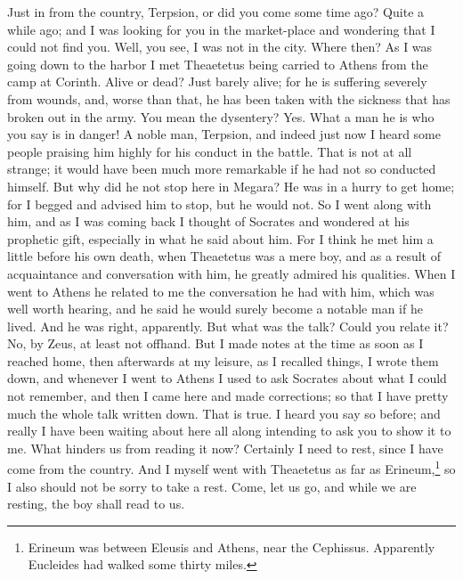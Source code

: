 \documentclass[letterpaper,12pt]{article}
\newcommand{\stephpag}[1]{\marginnote{\small\itshape\fontfamily{ppl}\selectfont #1}}
\begin{document}
\begin{drama}
\setlength{\parindent}{2em}

\eucleidesspeaks
\stephpag{142 a}Just in from the country, Terpsion, or did you come some time ago?
\terpsionspeaks
Quite a while ago; and I was looking for you in the market-place and wondering that I could not find you.
\eucleidesspeaks
Well, you see, I was not in the city.
\terpsionspeaks
Where then?
\eucleidesspeaks
As I was going down to the harbor I met Theaetetus being carried to Athens from the camp at Corinth.
\terpsionspeaks
Alive or dead? \stephpag{b}
\eucleidesspeaks
Just barely alive; for he is suffering severely from wounds, and, worse than that, he has been taken with the sickness that has broken out in the army.
\terpsionspeaks
You mean the dysentery?
\eucleidesspeaks
Yes.
\terpsionspeaks
What a man he is who you say is in danger!
\eucleidesspeaks
A noble man, Terpsion, and indeed just now I heard some people praising him highly for his conduct in the battle.
\terpsionspeaks
That is not at all strange; it would have been much more remarkable if he had not so conducted himself. But why did he not \stephpag{c} stop here in Megara?
\eucleidesspeaks
He was in a hurry to get home; for I begged and advised him to stop, but he would not. So I went along with him, and as I was coming back I thought of Socrates and wondered at his prophetic gift, especially in what he said about him. For I think he met him a little before his own death, when Theaetetus was a mere boy, and as a result of acquaintance and conversation with him, he greatly admired his qualities. When I went to Athens he related to me the conversation \stephpag{d} he had with him, which was well worth hearing, and he said he would surely become a notable man if he lived.
\terpsionspeaks
And he was right, apparently. But what was the talk? Could you relate it?
\eucleidesspeaks
No, by Zeus, at least not offhand. \stephpag{143 a} But I made notes at the time as soon as I reached home, then afterwards at my leisure, as I recalled things, I wrote them down, and whenever I went to Athens I used to ask Socrates about what I could not remember, and then I came here and made corrections; so that I have pretty much the whole talk written down.
\terpsionspeaks
That is true. I heard you say so before; and really I have been waiting about here all along intending to ask you to show it to me. What hinders us from reading it now? Certainly I need to rest, since I have come from the country. \stephpag{b}
\eucleidesspeaks
And I myself went with Theaetetus as far as Erineum,\footnote{Erineum was between Eleusis and Athens, near the Cephissus. Apparently Eucleides had walked some thirty miles.} so I also should not be sorry to take a rest. Come, let us go, and while we are resting, the boy shall read to us.

\end{drama}
\end{document}
